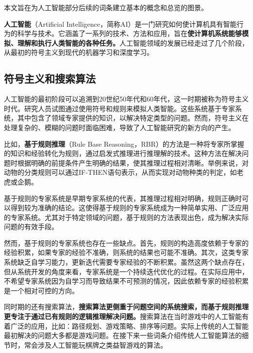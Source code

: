 
本文旨在为人工智能部分后续的词条建立基本的概念和总览的图景。

\textbf{人工智能}（Artificial Intelligence，简称AI）是一门研究如何使计算机具有智能行为的科学与技术。它涵盖了一系列的技术、方法和应用，旨在\textbf{使计算机系统能够模拟、理解和执行人类智能的各种任务。}人工智能领域的发展已经走过了几个阶段，从最初的符号主义到现代的机器学习和深度学习。

\subsection{符号主义和搜索算法}

人工智能的最初阶段可以追溯到20世纪50年代和60年代，这一时期被称为符号主义时代。研究人员试图通过使用符号和规则来模拟人类智能。这些系统基于专家系统，其中包含了领域专家提供的知识，以解决特定类型的问题。然而，符号主义在处理复杂的、模糊的问题时面临困难，导致了人工智能研究的新方向的产生。

比如，\textbf{基于规则推理}（Rule Base Reasoning，RBR）的方法是一种将专家所掌握的知识和经验转化为规则，通过启发式推理进行推理解的技术。这种方法在解决问题时根据明确的前提条件产生明确的结果，使其推理过程相对清晰。举例来说，对动物的分类规则可以通过IF-THEN语句表示，从而实现对动物种类的判定，如老虎或企鹅。

基于规则的专家系统是早期专家系统的代表，其推理过程相对明确，规则正确时可以得到较为准确的结论。这使得基于规则的专家系统成为一种简单实用、广泛应用的专家系统。尤其对于特定领域的问题，基于规则的方法表现出色，成为解决实际问题的有效手段。

然而，基于规则的专家系统也存在一些缺点。首先，规则的构造高度依赖于专家的经验积累，如果专家的经验不准确，则系统的结果也可能不准确。其次，这类专家系统缺乏自学习能力，更新迭代需要专家经验的不断积累。虽然这两个缺点存在，但从系统开发的角度来看，专家系统是一个持续迭代优化的过程。在实际应用中，不希望专家系统因为自学习而导致结果不可预测的情况，因此依赖专家的经验积累是一个相对可控的方向。

同时期的还有搜索算法，\textbf{搜索算法更侧重于问题空间的系统搜索，而基于规则推理更专注于通过已有规则的逻辑推理解决问题。}搜索算法在当时游戏中的人工智能有着广泛的应用，比如：路径规划、游戏策略、排序等问题。实际上传统的人工智能最初解决的问题大多都是游戏问题。在接下来一些词条介绍传统人工智能算法的细节时，常会涉及人工智能玩棋牌之类益智游戏的算法。

